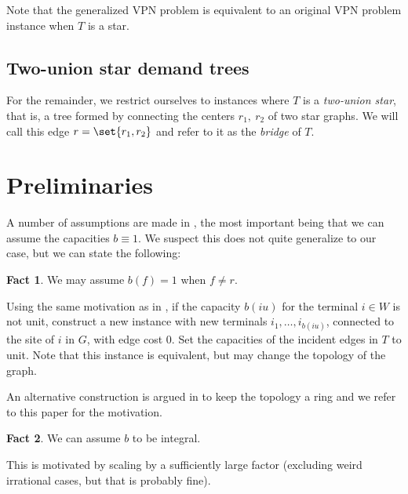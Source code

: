 \documentclass[11pt]{article}
\theoremstyle{definition}
\newtheorem{fact}{Fact}
\begin{document}
    Note that the generalized VPN problem is equivalent to an original VPN problem instance when $T$ is a star.


    \subsection{Two-union star demand trees}
    For the remainder, we restrict ourselves to instances where $T$ is a \emph{two-union star}, that is, a tree formed by connecting the centers $r_1,\ r_2$ of two star graphs.
    We will call this edge $r = \set{r_1, r_2}$ and refer to it as the \emph{bridge} of $T$.

    \section{Preliminaries}
    A number of assumptions are made in \cite{grandoni2008short}, the most important being that we can assume the capacities $b \equiv 1$.
    We suspect this does not quite generalize to our case, but we can state the following:

    \begin{fact}
        We may assume $b(f) = 1$ when $f \neq r$.
    \end{fact}
    Using the same motivation as in \cite{grandoni2008short}, if the capacity $b(iu)$ for the terminal $i \in W$ is not unit, construct a new instance with new terminals $i_1, \dots, i_{b(iu)}$, connected to the site of $i$ in $G$, with edge cost $0$.
    Set the capacities of the incident edges in $T$ to unit.
    Note that this instance is equivalent, but may change the topology of the graph.

    An alternative construction is argued in \cite{grandoni2008short} to keep the topology a ring and we refer to this paper for the motivation.

    \begin{fact}
        We can assume $b$ to be integral.
    \end{fact}
    This is motivated by scaling by a sufficiently large factor (excluding weird irrational cases, but that is probably fine).

\end{document}
